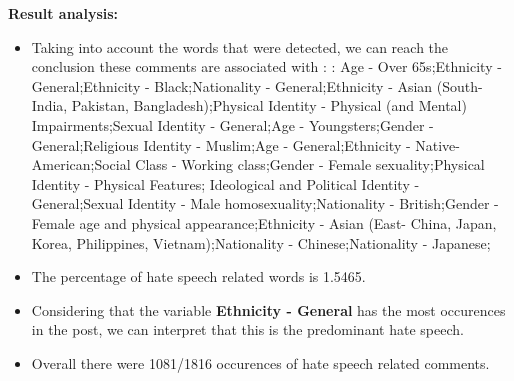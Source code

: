 \documentclass[11pt]{article}
\begin{document}
\textbf{\Large Result analysis:}

\begin{itemize}\item Taking into account the words that were detected, we can reach the conclusion these comments are associated with : : Age - Over 65s;Ethnicity - General;Ethnicity - Black;Nationality - General;Ethnicity - Asian (South- India, Pakistan, Bangladesh);Physical Identity - Physical (and Mental) Impairments;Sexual Identity - General;Age - Youngsters;Gender - General;Religious Identity - Muslim;Age - General;Ethnicity - Native-American;Social Class - Working class;Gender - Female sexuality;Physical Identity - Physical Features; Ideological and Political Identity - General;Sexual Identity - Male homosexuality;Nationality - British;Gender - Female age and physical appearance;Ethnicity - Asian (East- China, Japan, Korea, Philippines, Vietnam);Nationality - Chinese;Nationality - Japanese;%

\item The percentage of hate speech related words is 1.5465.

\item Considering that the variable \textbf{Ethnicity - General} has the most occurences in the post, we can interpret that this is the predominant hate speech.

\item Overall there were 1081/1816 occurences of hate speech related comments.\end{itemize}
\end{document}
